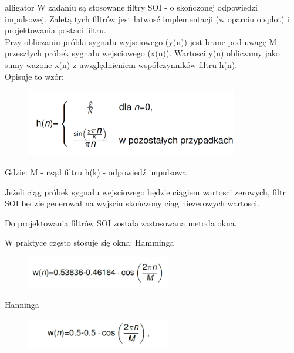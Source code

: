 \documentclass[12pt]{article}
\begin{document}
\begin{labeling}{alligator}
W zadaniu są stosowane filtry SOI - o skończonej odpowiedzi impulsowej. Zaletą tych filtrów jest łatwosć implementacji (w oparciu o splot) i projektowania postaci filtru. 
\\Przy obliczaniu próbki sygnału wyjsciowego (y(n)) jest brane pod uwagę M przeszłych próbek sygnału wejsciowego (x(n)). Wartosci y(n) obliczamy jako sumy ważone x(n) z uwzględnieniem współczynników filtru h(n). 
\\Opisuje to wzór:

\begin{figure}[h!]
 \centering
 \includegraphics[width=9.3cm]{filtrS.PNG}
 \vspace{-0.3cm}
 \label{Splot_indeks}
\end{figure}

Gdzie:
\subitem M - rząd filtru
\subitem h(k) - odpowiedź impulsowa

Jeżeli ciąg próbek sygnału wejsciowego będzie ciągiem wartosci zerowych,  filtr SOI będzie generował na wyjsciu skończony ciąg niezerowych wartosci.

Do projektowania filtrów SOI została zastosowana metoda okna.


W praktyce często stosuje się okna:
\subitem Hamminga

\begin{figure}[h!]
 \centering
 \includegraphics[width=6.3cm]{Hm.PNG}
 \vspace{-0.3cm}
 \label{gw}
\end{figure}

\subitem Hanninga

\begin{figure}[h!]
 \centering
 \includegraphics[width=6.3cm]{Hn.PNG}
 \vspace{-0.3cm}
 \label{gw}
\end{figure}


\end{labeling}
\end{document}
